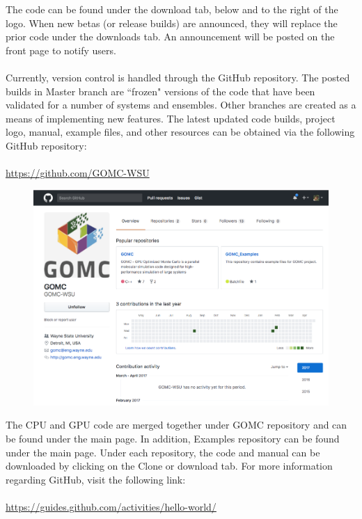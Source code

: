 The code can be found under the download tab, below and to the right of the logo.  When new betas (or release builds) are announced, they will replace the prior code under the downloads tab.  An announcement will be posted on the front page to notify users. \\\\
Currently, version control is handled through the GitHub repository.  The posted builds in Master branch are ``frozen" versions of the code that have been validated for a number of systems and ensembles. Other branches are created as a means of implementing new features. The latest updated code builds, project logo, manual, example files, and other resources can be obtained via the following GitHub repository:\\\\
\url{https://github.com/GOMC-WSU}

\begin{figure}[H]
\centering
\includegraphics[scale=0.6]{images/github}
\end{figure}

The CPU and GPU code are merged together under GOMC repository and can be found under the main page. In addition, Examples repository can be found under the main page. Under each repository, the code and manual can be downloaded by clicking on the Clone or download tab. For more information regarding GitHub, visit the following link:\\\\
\url{https://guides.github.com/activities/hello-world/}

